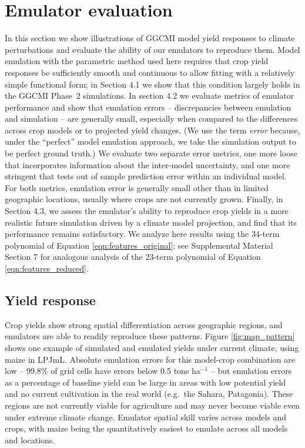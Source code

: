 \documentclass[gmdd]{copernicus} %
\begin{document}
\section{Emulator evaluation}
\label{S:4}
In this section we show illustrations of GGCMI model yield responses to climate perturbations and evaluate the ability of our emulators to reproduce them.   
Model emulation with the parametric method used here requires that crop yield responses be sufficiently smooth and continuous to allow fitting with a relatively simple functional form; in Section 4.1 we show that this condition largely holds in the GGCMI Phase~2 simulations. 
In section 4.2 we evaluate metrics of emulator performance and show that emulation errors -- discrepancies between emulation and simulation -- are generally small, especially when compared to the differences across crop models or to projected yield changes. (We use the term \textit{error} because, under the ``perfect'' model emulation approach, we take the simulation output to be perfect ground truth.)
We evaluate two separate error metrics, one more loose that incorporates information about the inter-model uncertainty, and one more stringent that tests out of sample prediction error within an individual model.
For both metrics, emulation error is generally small other than in limited geographic locations, usually where crops are not currently grown. 
Finally, in Section 4.3, we assess the emulator's ability to reproduce crop yields in a more realistic future simulation driven by a climate model projection, and find that its performance remains satisfactory.
We analyze here results using the 34-term polynomial of Equation \ref{eqn:features_original}; see Supplemental Material Section 7 for analogous analysis of the 23-term polynomial of Equation \ref{eqn:features_reduced}.


\subsection{Yield response}
\label{S:4.1}
Crop yields show strong spatial differentiation across geographic regions, and emulators are able to readily reproduce these patterns. Figure \ref{fig:map_pattern} shows one example of simulated and emulated yields under current climate, using maize in LPJmL. Absolute emulation errors for this model-crop combination are low --  99.8\% of grid cells  have errors below 0.5 tons ha$^{-1}$ -- but 
emulation errors as a percentage of baseline yield can be large in areas with low potential yield and no current cultivation in the real world (e.g.\ the Sahara, Patagonia).
These regions are not currently viable for agriculture and may never become viable even under extreme climate change.  
Emulator spatial skill varies across models and crops, with maize being the quantitatively easiest to emulate across all models and locations.
\end{document}
